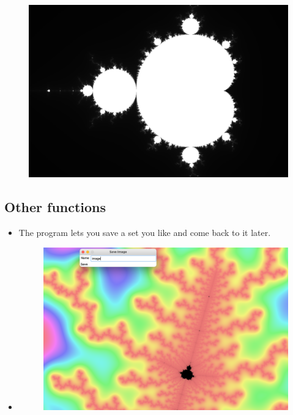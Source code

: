 \documentclass{beamer}
\begin{document}
\frame
{
\begin{figure}
\centering
\includegraphics[scale=0.3]{presentation_images/inverse_grayscale} 
\end{figure}
}

\subsection{Other functions}
\frame
{
\begin{itemize}
\item<1-> The program lets you save a set you like and come back to it later.
\item<2-> \begin{figure}
\centering
\includegraphics[scale=0.25]{presentation_images/save_image} 
\end{figure}
\end{itemize}
}
\end{document}
